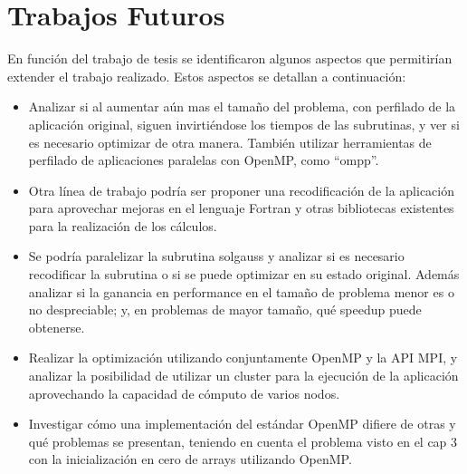 \section{Trabajos Futuros}
En funci\'on del trabajo de tesis se identificaron algunos aspectos que permitir\'ian extender el trabajo realizado. Estos aspectos se detallan a continuaci\'on:
\begin{itemize}
\item Analizar si al aumentar a\'un mas el tama\~no del problema, con perfilado de la aplicaci\'on original, siguen invirti\'endose los tiempos de las subrutinas, y ver si es necesario optimizar de otra manera. Tambi\'en utilizar herramientas de perfilado de aplicaciones paralelas con OpenMP, como ``ompp''.
\item Otra l\'inea de trabajo podr\'ia ser proponer una recodificaci\'on de la aplicaci\'on para aprovechar mejoras en el lenguaje Fortran y otras bibliotecas existentes para la realizaci\'on de los c\'alculos.
\item Se podr\'ia paralelizar la subrutina solgauss y analizar si es necesario recodificar la subrutina o si se puede optimizar en su estado original. Adem\'as analizar si la ganancia en performance en el tama\~no de problema menor es o no despreciable; y, en problemas de mayor tama\~no, qu\'e speedup puede obtenerse.
\item Realizar la optimizaci\'on utilizando conjuntamente OpenMP y la API MPI, y analizar la posibilidad de utilizar un cluster para la ejecuci\'on de la aplicaci\'on aprovechando la capacidad de c\'omputo de varios nodos.
\item Investigar c\'omo una implementaci\'on del est\'andar OpenMP difiere de otras y qu\'e problemas se presentan, teniendo en cuenta el problema visto en el cap 3 con la inicializaci\'on en cero de arrays utilizando OpenMP.

\end{itemize}
